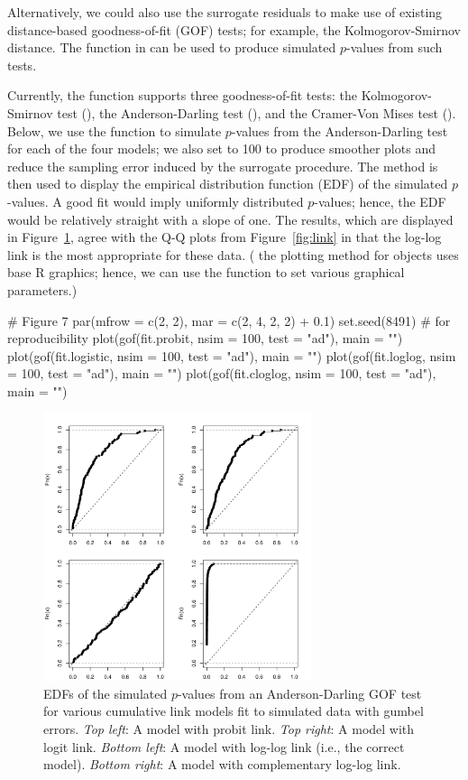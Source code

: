 Alternatively, we could also use the surrogate residuals to make use of existing distance-based goodness-of-fit (GOF) tests; for example, the Kolmogorov-Smirnov distance. The  function in  can be used to produce simulated $p$-values from such tests. 

Currently, the  function supports three goodness-of-fit tests: the Kolmogorov-Smirnov test (), the Anderson-Darling test (), and the Cramer-Von Mises test (). Below, we use the  function to simulate $p$-values from the Anderson-Darling test for each of the four models; we also set  to 100 to produce smoother plots and reduce the sampling error induced by the surrogate procedure. The  method is then used to display the empirical distribution function (EDF) of the simulated $p$-values. A good fit would imply uniformly distributed $p$-values; hence, the EDF would be relatively straight with a slope of one. The results, which are displayed in Figure~\ref{fig:gof}, agree with the Q-Q plots from Figure~\ref{fig:link} in that the log-log link is the most appropriate for these data. ( the plotting method for  objects uses base R graphics; hence, we can use the  function to set various graphical parameters.)
\begin{example}
# Figure 7
par(mfrow = c(2, 2), mar = c(2, 4, 2, 2) + 0.1) 
set.seed(8491)  # for reproducibility
plot(gof(fit.probit, nsim = 100, test = "ad"), main = "")
plot(gof(fit.logistic, nsim = 100, test = "ad"), main = "")
plot(gof(fit.loglog, nsim = 100, test = "ad"), main = "")
plot(gof(fit.cloglog, nsim = 100, test = "ad"), main = "")
\end{example}

\begin{figure}[!htbp]
  \centering
  \includegraphics[width=0.7\textwidth]{gof}
  \caption{EDFs of the simulated $p$-values from an Anderson-Darling GOF test for various cumulative link models fit to simulated data with gumbel errors. \textit{Top left}: A model with probit link. \textit{Top right}: A model with logit link. \textit{Bottom left}: A model with log-log link (i.e., the correct model). \textit{Bottom right}: A model with complementary log-log link.}  
  \label{fig:gof}
\end{figure}


